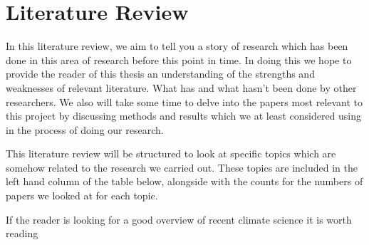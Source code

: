 \chapter{Literature Review}
In this literature review, we aim to tell you a story of research which has been done in this area of research before this point in time. In doing this we hope to provide the reader of this thesis an understanding of the strengths and weaknesses of relevant literature. What has and what hasn't been done by other researchers. We also will take some time to delve into the papers most relevant to this project by discussing methods and results which we at least considered using in the process of doing our research.\medskip

This literature review will be structured to look at specific topics which are somehow related to the research we carried out. These topics are included in the left hand column of the table below, alongside with the counts for the numbers of papers we looked at for each topic.

If the reader is looking for a good overview of recent climate science it is worth reading \cite{clem}

% 

% 
% 
% 
% 
% 
% 